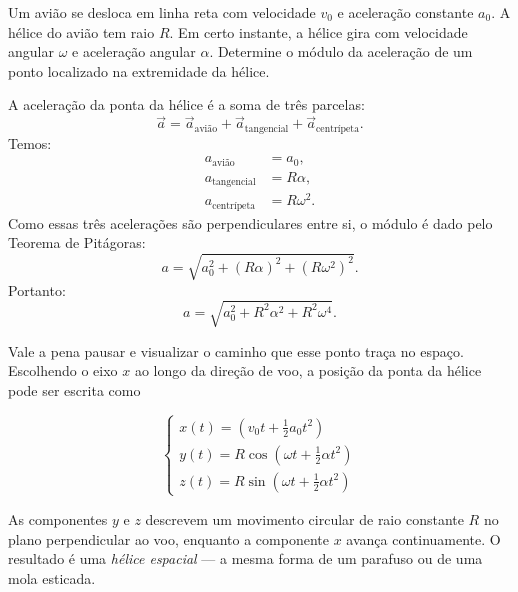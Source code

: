 \begin{exemplo}[Nível II]\label{exemplo_cinematicavetorial_aceleracaotangencialex03}

Um avião se desloca em linha reta com velocidade $v_0$ e aceleração
constante $a_0$. A hélice do avião tem raio $R$. Em certo instante,
a hélice gira com velocidade angular $\omega$ e aceleração angular
$\alpha$. Determine o módulo da aceleração de um ponto localizado na
extremidade da hélice.

\resolucao

A aceleração da ponta da hélice é a soma de três parcelas:
%
\begin{equation}
    \vec{a} = \vec{a}_{\text{avião}}
            + \vec{a}_{\text{tangencial}}
            + \vec{a}_{\text{centrípeta}}.
\end{equation}
%
Temos:
%
\begin{align}
    a_{\text{avião}}     &= a_0,    \nonumber  \\
    a_{\text{tangencial}}&= R\alpha, \nonumber \\
    a_{\text{centrípeta}}&= R\omega^2. \nonumber
\end{align}
%
Como essas três acelerações são perpendiculares entre si, o módulo é dado pelo Teorema de Pitágoras:
%
\begin{equation}
    a = \sqrt{a_0^2 + (R\alpha)^2 + (R\omega^2)^2}.
    \nonumber
\end{equation}
%
Portanto:
%
\begin{equation}
    \boxed{a = \sqrt{a_0^2 + R^2\alpha^2 + R^2\omega^4}.}
    \nonumber
\end{equation}

Vale a pena pausar e visualizar o caminho que esse ponto traça no
espaço. Escolhendo o eixo $x$ ao longo da direção de voo, a posição
da ponta da hélice pode ser escrita como
%


\begin{equation}
\begin{cases}
    x(t) =  \left(v_0 t + \tfrac{1}{2}a_0 t^2\right) \\[6pt] 
    y(t) = R\cos\!\left(\omega t + \tfrac{1}{2}\alpha t^2\right) \\[6pt] 
    z(t) = R\sin\!\left(\omega t + \tfrac{1}{2}\alpha t^2\right)
\end{cases}
    \nonumber
\end{equation}

%
As componentes $y$ e $z$ descrevem um movimento circular de raio
constante $R$ no plano perpendicular ao voo, enquanto a componente
$x$ avança continuamente. O resultado é uma \textit{hélice espacial}
— a mesma forma de um parafuso ou de uma mola esticada.


\end{exemplo}
